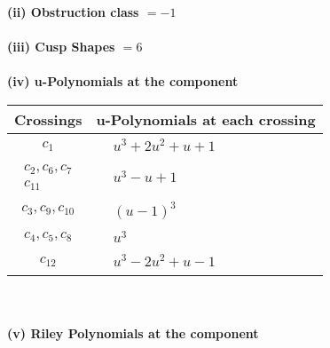 \documentclass[1p]{elsarticle_modified}
\theoremstyle{definition}
\begin{document}
\flushleft \textbf{(ii) Obstruction class $= -1$}\\~\\
\flushleft \textbf{(iii) Cusp Shapes $= 6$}\\~\\
\newpage\renewcommand{\arraystretch}{1}
\flushleft \textbf{(iv) u-Polynomials at the component}\newline \\
\begin{tabular}{m{50pt}|m{274pt}}
Crossings & \hspace{64pt}u-Polynomials at each crossing \\
\hline $$\begin{aligned}c_{1}\end{aligned}$$&$\begin{aligned}
&u^3+2 u^2+u+1
\end{aligned}$\\
\hline $$\begin{aligned}c_{2},c_{6},c_{7}\\c_{11}\end{aligned}$$&$\begin{aligned}
&u^3- u+1
\end{aligned}$\\
\hline $$\begin{aligned}c_{3},c_{9},c_{10}\end{aligned}$$&$\begin{aligned}
&(u-1)^3
\end{aligned}$\\
\hline $$\begin{aligned}c_{4},c_{5},c_{8}\end{aligned}$$&$\begin{aligned}
&u^3
\end{aligned}$\\
\hline $$\begin{aligned}c_{12}\end{aligned}$$&$\begin{aligned}
&u^3-2 u^2+u-1
\end{aligned}$\\
\hline
\end{tabular}\\~\\
\newpage\renewcommand{\arraystretch}{1}
\flushleft \textbf{(v) Riley Polynomials at the component}\newline \\
\end{document}
